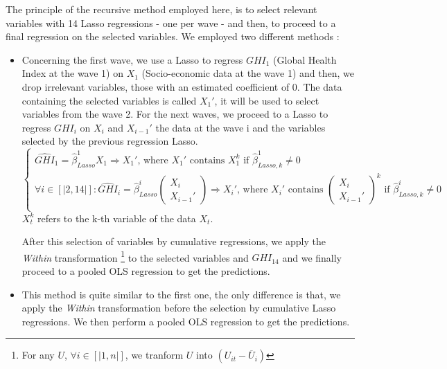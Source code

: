 \documentclass[]{article}
\begin{document}
The principle of the recursive method employed here, is to select relevant variables with 14 Lasso regressions - one per wave - and then, to proceed to a final regression on the selected variables. We employed two different methods :
\begin{itemize}
    \item Concerning the first wave, we use a Lasso to regress $GHI_1$ (Global Health Index at the wave 1) on $X_1$ (Socio-economic data at the wave 1) and then, we drop irrelevant variables, those with an estimated coefficient of 0. The data containing the selected variables is called $X_1'$, it will be used to select variables from the wave 2. For the next waves, we proceed to a Lasso to regress $GHI_i$ on $X_i$ and $X_{i-1}'$ the data at the wave i and the variables selected by the previous regression Lasso. $$\left\{
    \begin{array}{lll}
        \widehat{GHI}_{1} = \widehat{\beta}_{Lasso}^1 {X}_{1} \Longrightarrow {X}_{1}' \text{, where } {X}_{1}' \text{ contains } {X}_{1}^k \text{ if } \widehat{\beta}_{Lasso, k}^1 \ne 0 \\
    \forall i \in [|2,14|] : \widehat{GHI}_{i} = \widehat{\beta}_{Lasso}^i \begin{pmatrix}
         {X}_{i}\\
        {X}_{i-1}'
    \end{pmatrix} \Longrightarrow {X}_{i}' \text{, where } {X}_{i}' \text{ contains } \begin{pmatrix}
         {X}_{i}\\
        {X}_{i-1}'
    \end{pmatrix}^k \text{ if } \widehat{\beta}_{Lasso, k}^i \ne 0\\
    \end{array}
\right.$$ ${X}_{t}^k$ refers to the k-th variable of the data ${X}_{t}$.

After this selection of variables by cumulative regressions, we apply the \textit{Within} transformation \footnote{For any $U$,  $\forall i \in [|1,n|]$, we tranform $U$ into $(U_{it} -\overline{U}_i )$} to the selected variables and $GHI_{14}$ and we finally proceed to a pooled OLS regression to get the predictions.

    \item This method is quite similar to the first one, the only difference is that, we apply the \textit{Within} transformation before the selection by cumulative Lasso regressions. We then perform a pooled OLS regression to get the predictions.
\end{itemize}
\end{document}
